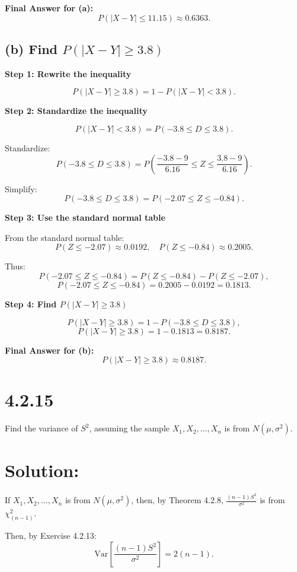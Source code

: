 \documentclass{article}
\begin{document}
\textbf{Final Answer for (a):}
\[
P(|X - Y| \leq 11.15) \approx 0.6363.
\]

\subsection*{(b) Find $P(|X - Y| \geq 3.8)$}

\textbf{Step 1: Rewrite the inequality}

\[
P(|X - Y| \geq 3.8) = 1 - P(|X - Y| < 3.8).
\]

\textbf{Step 2: Standardize the inequality}

\[
P(|X - Y| < 3.8) = P(-3.8 \leq D \leq 3.8).
\]

Standardize:
\[
P(-3.8 \leq D \leq 3.8) = P\left(\frac{-3.8 - 9}{6.16} \leq Z \leq \frac{3.8 - 9}{6.16}\right).
\]

Simplify:
\[
P(-3.8 \leq D \leq 3.8) = P(-2.07 \leq Z \leq -0.84).
\]

\textbf{Step 3: Use the standard normal table}

From the standard normal table:
\[
P(Z \leq -2.07) \approx 0.0192, \quad P(Z \leq -0.84) \approx 0.2005.
\]

Thus:
\[
P(-2.07 \leq Z \leq -0.84) = P(Z \leq -0.84) - P(Z \leq -2.07),
\]
\[
P(-2.07 \leq Z \leq -0.84) = 0.2005 - 0.0192 = 0.1813.
\]

\textbf{Step 4: Find $P(|X - Y| \geq 3.8)$}

\[
P(|X - Y| \geq 3.8) = 1 - P(-3.8 \leq D \leq 3.8),
\]
\[
P(|X - Y| \geq 3.8) = 1 - 0.1813 = 0.8187.
\]

\textbf{Final Answer for (b):}
\[
P(|X - Y| \geq 3.8) \approx 0.8187.
\]


\section*{4.2.15}

Find the variance of $S^2$, assuming the sample $X_1, X_2, \dots, X_n$ is from $N(\mu, \sigma^2)$.

\section*{Solution:}

If $X_1, X_2, \dots, X_n$ is from $N(\mu, \sigma^2)$,  
then, by Theorem 4.2.8, $\frac{(n-1)S^2}{\sigma^2}$ is from $\chi^2_{(n-1)}$.

Then, by Exercise 4.2.13:
\[
\text{Var} \left[ \frac{(n-1)S^2}{\sigma^2} \right] = 2(n-1).
\]
\end{document}
